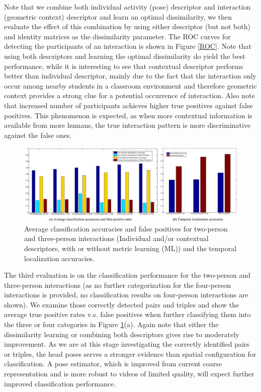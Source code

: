 Note that we combine both individual activity (pose) descriptor and interaction (geometric context) descriptor and learn an optimal dissimilarity, we then evaluate the effect of this combination by using either descriptor (but not both) and identity matrices as the dissimilarity parameter. The ROC curves for detecting the participants of an interaction is shown in Figure \ref{ROC}. Note that using both descriptors and learning the optimal dissimilarity do yield the best performance, while it is interesting to see that contextual descriptor performs better than individual descriptor, mainly due to the fact that the interaction only occur among nearby students in a classroom environment and therefore geometric context provides a strong clue for a potential occurrence of interaction. Also note that increased number of participants achieves higher true positives against false positives. This phenomenon is expected, as when more contextual information is available from more humans, the true interaction pattern is more discriminative against the false ones.

\begin{figure}[t]
\begin{center}
\includegraphics[scale=2.5]{classtemporal.png}
\end{center}
\caption{ Average classification accuracies and false positives for two-person and three-person interactions (Individual and/or contextual descriptors, with or without metric learning (ML)) and the temporal localization accuracies.}
\label{classtemporal}
\end{figure}

The third evaluation is on the classification performance for the two-person and three-person interactions (as no further categorization for the four-person interactions is provided, no classification results on four-person interactions are shown). We examine those correctly detected pairs and triples and show the average true positive rates v.s. false positives when further classifying them into the three or four categories in Figure \ref{classtemporal}(a). Again note that either the dissimilarity learning or combining both descriptors gives rise to moderately improvement. As we are  at this stage investigating the correctly identified pairs or triples, the head poses serves a stronger evidence than spatial configuration for classification. A pose estimator, which is improved from current coarse representation and is more robust to videos of limited quality, will expect further improved classification performance.


